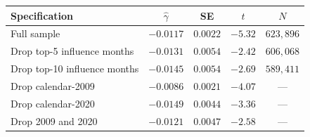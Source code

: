 \begin{tabular}{lcccc}
\hline\hline
Specification & $\hat\gamma$ & SE & $t$ & $N$ \\
\hline
Full sample & $-0.0117$ & $0.0022$ & $-5.32$ & $623,896$ \\
Drop top-5 influence months & $-0.0131$ & $0.0054$ & $-2.42$ & $606,068$ \\
Drop top-10 influence months & $-0.0145$ & $0.0054$ & $-2.69$ & $589,411$ \\
Drop calendar-2009 & $-0.0086$ & $0.0021$ & $-4.07$ & --- \\
Drop calendar-2020 & $-0.0149$ & $0.0044$ & $-3.36$ & --- \\
Drop 2009 and 2020 & $-0.0121$ & $0.0047$ & $-2.58$ & --- \\
\hline\hline
\end{tabular}
